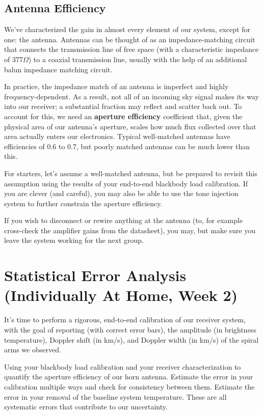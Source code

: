 \documentclass[11pt,preprint]{aastex}
\begin{document}
\subsection{Antenna Efficiency}

We've characterized the gain in almost every element of our system, except
for one: the antenna. Antennas can be thought of as an impedance-matching
circuit that connects the transmission line of free space (with a characteristic
impedance of 377$\Omega$) to a coaxial transmission line, usually with the
help of an additional balun impedance matching circuit.

In practice, the impedance match of an antenna is imperfect and highly 
frequency-dependent. As a result, not all of an incoming sky signal makes its
way into our receiver; a substantial fraction may reflect and scatter back
out. To account for this, we need an {\bf aperture efficiency}
coefficient that, given the physical area of our antenna's aperture, 
scales how much flux collected over that area actually enters our electronics.
Typical well-matched antennas have efficiencies of 0.6 to 0.7, but poorly matched
antennas can be much lower than this.

For starters, let's assume a well-matched antenna, but be prepared
to revisit this assumption using the results of your end-to-end blackbody load
calibration. If you are clever (and careful), you may also be able to use
the tone injection system to further constrain the aperture efficiency.

If you wish to disconnect or rewire anything at the antenna (to, for example
cross-check the amplifier gains from the datasheet), you may, but make
sure you leave the system working for the next group.

\section {Statistical Error Analysis (Individually At Home, Week 2)} \label{secondweek}
 
It's time to perform a rigorous, end-to-end calibration of our receiver system,
with the goal of reporting (with correct error bars), the amplitude (in
brightness temperature), Doppler shift (in km/s), and Doppler width (in km/s)
of the spiral arms we observed.

Using your blackbody load calibration and your receiver characterization
to quantify the aperture efficiency of our horn antenna. Estimate the error
in your calibration multiple ways and check for consistency between them.
Estimate the error in your removal of the baseline system temperature.
These are all systematic errors that contribute to our uncertainty.
\end{document}
